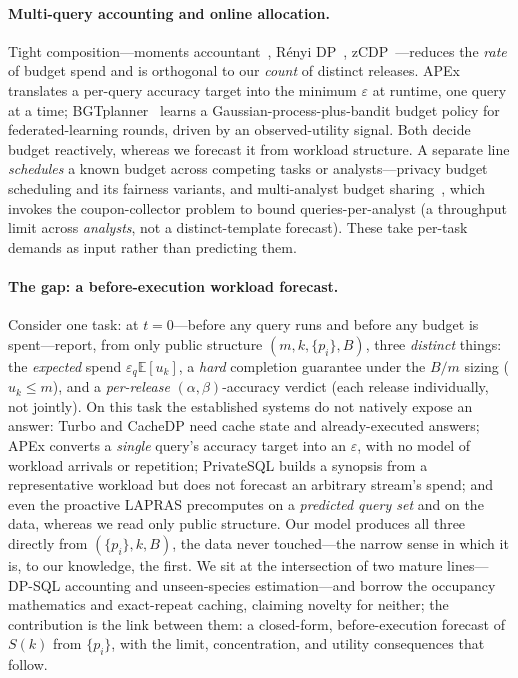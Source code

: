 \documentclass[sigconf,nonacm]{acmart}
\newcommand{\eps}{\varepsilon}
\newcommand{\E}{\mathbb{E}}
\begin{document}
\paragraph{Multi-query accounting and online allocation.}
Tight composition---moments accountant~\cite{abadi2016deep}, R\'enyi DP~\cite{mironov2017renyi}, zCDP~\cite{bun2016concentrated}---reduces the \emph{rate} of budget spend and is orthogonal to our \emph{count} of distinct releases. APEx~\cite{ge2019apex} translates a per-query accuracy target into the minimum $\eps$ at runtime, one query at a time; BGTplanner~\cite{zhang2024bgtplanner} learns a Gaussian-process-plus-bandit budget policy for federated-learning rounds, driven by an observed-utility signal. Both decide budget reactively, whereas we forecast it from workload structure. A separate line \emph{schedules} a known budget across competing tasks or analysts---privacy budget scheduling and its fairness variants, and multi-analyst budget sharing~\cite{pujol2023multianalyst}, which invokes the coupon-collector problem to bound queries-per-analyst (a throughput limit across \emph{analysts}, not a distinct-template forecast). These take per-task demands as input rather than predicting them.

\paragraph{The gap: a before-execution workload forecast.}
Consider one task: at $t{=}0$---before any query runs and before any budget is spent---report, from only public structure $(m,k,\{p_i\},B)$, three \emph{distinct} things: the \emph{expected} spend $\eps_q\E[u_k]$, a \emph{hard} completion guarantee under the $B/m$ sizing ($u_k\le m$), and a \emph{per-release} $(\alpha,\beta)$-accuracy verdict (each release individually, not jointly). On this task the established systems do not natively expose an answer: Turbo and CacheDP need cache state and already-executed answers; APEx converts a \emph{single} query's accuracy target into an $\eps$, with no model of workload arrivals or repetition; PrivateSQL builds a synopsis from a representative workload but does not forecast an arbitrary stream's spend; and even the proactive LAPRAS precomputes on a \emph{predicted query set} and on the data, whereas we read only public structure. Our model produces all three directly from $(\{p_i\},k,B)$, the data never touched---the narrow sense in which it is, to our knowledge, the first. We sit at the intersection of two mature lines---DP-SQL accounting and unseen-species estimation---and borrow the occupancy mathematics and exact-repeat caching, claiming novelty for neither; the contribution is the link between them: a closed-form, before-execution forecast of $S(k)$ from $\{p_i\}$, with the limit, concentration, and utility consequences that follow.
\end{document}
